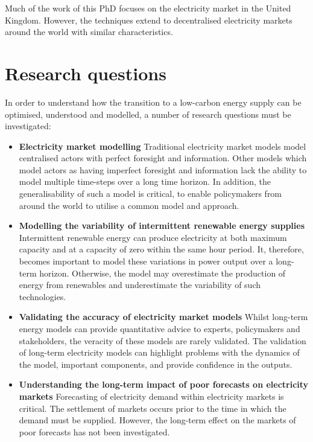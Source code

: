 Much of the work of this PhD focuses on the electricity market in the United Kingdom. However, the techniques extend to decentralised electricity markets around the world with similar characteristics. 









\section{Research questions}


In order to understand how the transition to a low-carbon energy supply can be optimised, understood and modelled, a number of research questions must be investigated:

\begin{itemize}
	
	
	\item \textbf{Electricity market modelling} Traditional electricity market models model centralised actors with perfect foresight and information. Other models which model actors as having imperfect foresight and information lack the ability to model multiple time-steps over a long time horizon. In addition, the generalisability of such a model is critical, to enable policymakers from around the world to utilise a common model and approach.
	
	\item \textbf{Modelling the variability of intermittent renewable energy supplies} Intermittent renewable energy can produce electricity at both maximum capacity and at a capacity of zero within the same hour period. It, therefore, becomes important to model these variations in power output over a long-term horizon. Otherwise, the model may overestimate the production of energy from renewables and underestimate the variability of such technologies.
	
	\item \textbf{Validating the accuracy of electricity market models} Whilst long-term energy models can provide quantitative advice to experts, policymakers and stakeholders, the veracity of these models are rarely validated. The validation of long-term electricity models can highlight problems with the dynamics of the model, important components, and provide confidence in the outputs. 
	
	
	\item \textbf{Understanding the long-term impact of poor forecasts on electricity markets} Forecasting of electricity demand within electricity markets is critical. The settlement of markets occurs prior to the time in which the demand must be supplied. However, the long-term effect on the markets of poor forecasts has not been investigated.
	

\end{itemize}
